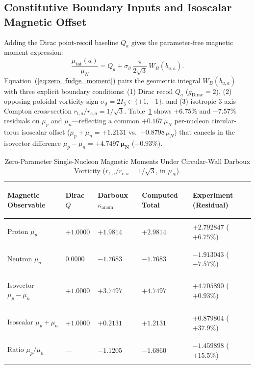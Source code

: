 \documentclass[11pt, a4paper]{article}
\begin{document}
\subsection{Constitutive Boundary Inputs and Isoscalar Magnetic Offset}
Adding the Dirac point-recoil baseline $Q_a$ gives the parameter-free magnetic moment expression:
\begin{equation}
    \frac{\mu_{\mathrm{tot}}(a)}{\mu_N} = Q_a + \sigma_\vartheta\,\frac{\pi}{2\sqrt{3}}\,W_B(b_{u,a}).
    \label{eq:zero_fudge_moment}
\end{equation}
Equation~(\ref{eq:zero_fudge_moment}) pairs the geometric integral $W_B(b_{u,a})$ with three explicit boundary conditions: (1) Dirac recoil $Q_a$ ($g_{\mathrm{Dirac}} = 2$), (2) opposing poloidal vorticity sign $\sigma_\vartheta = 2I_3 \in \{+1, -1\}$, and (3) isotropic 3-axis Compton cross-section $r_{t,a}/r_{c,a} = 1/\sqrt{3}$. Table~\ref{tab:magnetic_ledger} shows $+6.75\%$ and $-7.57\%$ residuals on $\mu_p$ and $\mu_n$—reflecting a common $+0.167\,\mu_N$ per-nucleon circular-torus isoscalar offset ($\mu_p + \mu_n = +1.2131$ vs.\ $+0.8798\,\mu_N$) that cancels in the isovector difference $\mu_p - \mu_n = \mathbf{+4.7497\,\mu_N}$ ($+0.93\%$).

\begin{table}[!htbp]
\centering
\caption{Zero-Parameter Single-Nucleon Magnetic Moments Under Circular-Wall Darboux Vorticity ($r_{t,a}/r_{c,a} = 1/\sqrt{3}$, in $\mu_N$).}
\label{tab:magnetic_ledger}
\footnotesize
\setlength{\tabcolsep}{5pt}
\renewcommand{\arraystretch}{1.18}
\begin{tabularx}{\textwidth}{>{\bfseries\raggedright\arraybackslash}p{} >{\centering\arraybackslash}X >{\centering\arraybackslash}X >{\centering\arraybackslash}X >{\centering\arraybackslash}X}
\toprule
Magnetic Observable & Dirac $Q$ & Darboux $\kappa_{\mathrm{anom}}$ & Computed Total & Experiment (Residual) \\
\midrule
Proton $\mu_p$ & $+1.0000$ & $+1.9814$ & $\mathbf{+2.9814}$ & $+2.792847$ ($+6.75\%$) \\
Neutron $\mu_n$ & $0.0000$ & $-1.7683$ & $\mathbf{-1.7683}$ & $-1.913043$ ($-7.57\%$) \\
Isovector $\mu_p - \mu_n$ & $+1.0000$ & $+3.7497$ & $\mathbf{+4.7497}$ & $+4.705890$ ($+0.93\%$) \\
Isoscalar $\mu_p + \mu_n$ & $+1.0000$ & $+0.2131$ & $+1.2131$ & $+0.879804$ ($+37.9\%$) \\
Ratio $\mu_p / \mu_n$ & --- & $-1.1205$ & $-1.6860$ & $-1.459898$ ($+15.5\%$) \\
\bottomrule
\end{tabularx}
\end{table}
\end{document}
